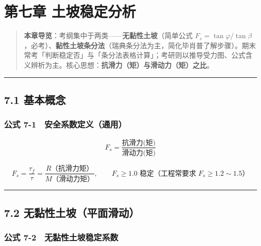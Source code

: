 \documentclass[
]{article}
\begin{document}
\newpage

\section{第七章
土坡稳定分析}\label{ux7b2cux4e03ux7ae0-ux571fux5761ux7a33ux5b9aux5206ux6790}

\begin{quote}
\textbf{本章导览}：考纲集中于两类------\textbf{无黏性土坡}（简单公式
\(F_s=\tan\varphi/\tan\beta\)，必考）、\textbf{黏性土坡条分法}（瑞典条分法为主，简化毕肖普了解步骤）。期末常考「判断稳定否」与「条分法表格计算」；考研则以推导受力图、公式含义辨析为主。核心思想：\textbf{抗滑力（矩）与滑动力（矩）之比}。
\end{quote}

\begin{center}\rule{0.5\linewidth}{0.5pt}\end{center}

\subsection{7.1 基本概念}\label{ux57faux672cux6982ux5ff5}

\subsubsection{公式
7-1　安全系数定义（通用）}\label{ux516cux5f0f-7-1-ux5b89ux5168ux7cfbux6570ux5b9aux4e49ux901aux7528}

\[F_s=\frac{\text{抗滑力(矩)}}{\text{滑动力(矩)}}\]

\[F_s=\frac{\tau_{f}}{\tau}=\frac{R\text{（抗滑力矩）}}{M\text{（滑动力矩）}},\qquad F_s\ge1.0\text{ 稳定（工程常要求 }F_s\ge1.2\sim1.5\text{）}\]

\begin{center}\rule{0.5\linewidth}{0.5pt}\end{center}

\subsection{7.2
无黏性土坡（平面滑动）}\label{ux65e0ux9ecfux6027ux571fux5761ux5e73ux9762ux6ed1ux52a8}

\subsubsection{公式
7-2　无黏性土坡稳定系数}\label{ux516cux5f0f-7-2-ux65e0ux9ecfux6027ux571fux5761ux7a33ux5b9aux7cfbux6570}
\end{document}
